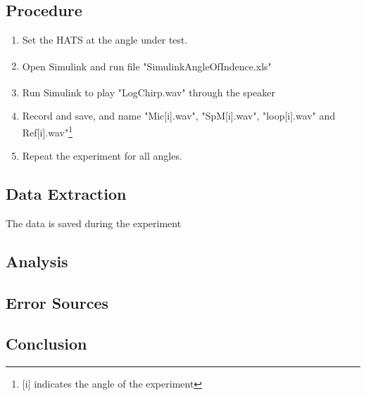 \subsection{Procedure}
\begin{enumerate}
	\item Set the HATS at the angle under test. 
	\item Open Simulink\textsuperscript{\textregistered} and run file "SimulinkAngleOfIndence.xls"
	\item Run Simulink\textsuperscript{\textregistered} to play "LogChirp.wav" through the speaker
	\item Record and save, and name "Mic[i].wav", "SpM[i].wav", "loop[i].wav" and Ref[i].wav"\footnote{[i] indicates the angle of the experiment}
	\item Repeat the experiment for all angles.
\end{enumerate}

\subsection{Data Extraction}
The data is saved during the experiment

\subsection{Analysis}

\subsection{Error Sources}

\subsection{Conclusion}